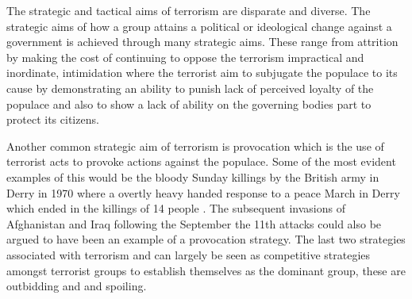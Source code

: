 The strategic and tactical aims of terrorism are disparate and diverse. The strategic aims of how a group attains a political or ideological change against a government is achieved through many strategic aims. These range from attrition by making the cost of continuing to oppose the terrorism impractical and inordinate, intimidation where the terrorist aim to subjugate the populace to its cause by demonstrating an ability to punish lack of perceived loyalty of the populace and also to show a lack of ability on the governing bodies part to protect its citizens. 

Another common strategic aim of terrorism is provocation which is the use of terrorist acts to provoke actions against the populace. Some of the most evident examples of this would be the bloody Sunday killings by the British army in Derry in 1970 where a overtly heavy handed response to a peace March in Derry which ended in the killings of 14 people \citep{dawson2005trauma}. The subsequent invasions of Afghanistan and Iraq following the September the 11th attacks could also be argued to have been an example of a provocation strategy.  The last two strategies associated with terrorism and can largely be seen as competitive strategies amongst terrorist groups to establish themselves as the dominant group, these are outbidding and and spoiling. 


